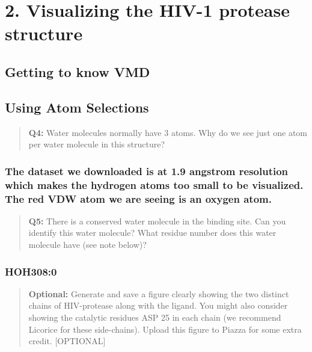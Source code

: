 \documentclass[
]{article}
\begin{document}
\hypertarget{visualizing-the-hiv-1-protease-structure}{%
\section{2. Visualizing the HIV-1 protease
structure}\label{visualizing-the-hiv-1-protease-structure}}

\hypertarget{getting-to-know-vmd}{%
\subsection{Getting to know VMD}\label{getting-to-know-vmd}}

\hypertarget{using-atom-selections}{%
\subsection{Using Atom Selections}\label{using-atom-selections}}

\begin{quote}
\textbf{Q4:} Water molecules normally have 3 atoms. Why do we see just
one atom per water molecule in this structure?
\end{quote}

\hypertarget{the-dataset-we-downloaded-is-at-1.9-angstrom-resolution-which-makes-the-hydrogen-atoms-too-small-to-be-visualized.-the-red-vdw-atom-we-are-seeing-is-an-oxygen-atom.}{%
\subsubsection{The dataset we downloaded is at 1.9 angstrom resolution
which makes the hydrogen atoms too small to be visualized. The red VDW
atom we are seeing is an oxygen
atom.}\label{the-dataset-we-downloaded-is-at-1.9-angstrom-resolution-which-makes-the-hydrogen-atoms-too-small-to-be-visualized.-the-red-vdw-atom-we-are-seeing-is-an-oxygen-atom.}}

\begin{quote}
\textbf{Q5:} There is a conserved water molecule in the binding site.
Can you identify this water molecule? What residue number does this
water molecule have (see note below)?
\end{quote}

\hypertarget{hoh3080}{%
\subsubsection{HOH308:0}\label{hoh3080}}

\begin{quote}
\textbf{Optional:} Generate and save a figure clearly showing the two
distinct chains of HIV-protease along with the ligand. You might also
consider showing the catalytic residues ASP 25 in each chain (we
recommend Licorice for these side-chains). Upload this figure to Piazza
for some extra credit. {[}OPTIONAL{]}
\end{quote}
\end{document}
